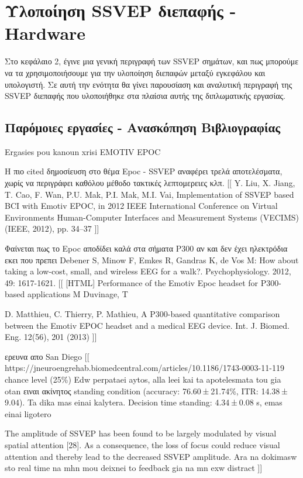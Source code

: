 \documentclass[11pt,a4paper,english,greek,twoside]{../Thesis}
\begin{document}
\chapter{Υλοποίηση SSVEP διεπαφής - Hardware} \label{chap:SSVEP_implementation}
Στο κεφάλαιο 2, έγινε μια γενική περιγραφή των SSVEP σημάτων, και πως μπορούμε να τα χρησιμοποιήσουμε για την υλοποίηση διεπαφών μεταξύ εγκεφάλου και υπολογιστή. Σε αυτή την ενότητα θα γίνει παρουσίαση και αναλυτική περιγραφή της SSVEP διεπαφής που υλοποιήθηκε στα πλαίσια αυτής της διπλωματικής εργασίας.

\section{Παρόμοιες εργασίες - Ανασκόπηση Βιβλιογραφίας}

Ergasies pou kanoun xrisi EMOTIV EPOC

Η πιο cited δημοσίευση στο θέμα Epoc - SSVEP αναφέρει τρελά αποτελέσματα, χωρίς να περιγράφει καθόλου μέθοδο τακτικές λεπτομερειες κλπ.
[[
Y. Liu, X. Jiang, T. Cao, F. Wan, P.U. Mak, P.I. Mak, M.I. Vai, Implementation of SSVEP based BCI with Emotiv EPOC, in 2012 IEEE International Conference on Virtual Environments Human-Computer Interfaces and Measurement Systems (VECIMS) (IEEE, 2012), pp. 34–37
]]

Φαίνεται πως το Epoc αποδίδει καλά στα σήματα P300 αν και δεν έχει ηλεκτρόδια εκει που πρεπει Debener S, Minow F, Emkes R, Gandras K, de Vos M: How about taking a low-cost, small, and wireless EEG for a walk?. Psychophysiology. 2012, 49: 1617-1621.
[[
[HTML] Performance of the Emotiv Epoc headset for P300-based applications
M Duvinage, T

D. Matthieu, C. Thierry, P. Mathieu, A P300-based quantitative comparison between the Emotiv EPOC headset and a medical EEG device. Int. J. Biomed. Eng. 12(56), 201 (2013)
]]

ερευνα απο San Diego
[[
https://jneuroengrehab.biomedcentral.com/articles/10.1186/1743-0003-11-119
chance level (25\%) 
Edw perpataei aytos, alla leei kai ta apotelesmata tou gia otan ειναι ακίνητος
standing condition (accuracy: 76.60 ± 21.74\%, ITR: 14.38 ± 9.04).  Ta dika mas einai kalytera.
Decision time standing: 4.34 ± 0.08 s, emas einai ligotero

The amplitude of SSVEP has been found to be largely modulated by visual spatial attention [28]. As a consequence, the loss of focus could reduce visual attention and thereby lead to the decreased SSVEP amplitude.
Ara na dokimasw sto real time na mhn mou deixnei to feedback gia na mn exw distract
]]
\end{document}
